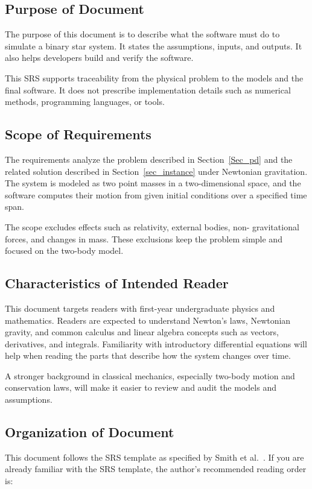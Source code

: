\documentclass[12pt]{article}
\begin{document}
\subsection{Purpose of Document}

The purpose of this document is to describe what the software must do to
simulate a binary star system. It states the assumptions, inputs, and outputs.
It also helps developers build and verify the software.

This SRS supports traceability from the physical problem to the models and the
final software. It does not prescribe implementation details such as numerical
methods, programming languages, or tools.

\subsection{Scope of Requirements} \label{sec_Scope}

The requirements analyze the problem described in Section~\ref{Sec_pd} and the
related solution described in Section~\ref{sec_instance} under Newtonian
gravitation. The system is modeled as two point masses in a two-dimensional
space, and the software computes their motion from given initial conditions over
a specified time span.

The scope excludes effects such as relativity, external bodies, non-
gravitational forces, and changes in mass. These exclusions keep the problem
simple and focused on the two-body model.

\subsection{Characteristics of Intended Reader} \label{sec_IntendedReader}

This document targets readers with first-year undergraduate physics and
mathematics. Readers are expected to understand Newton's laws, Newtonian
gravity, and common calculus and linear algebra concepts such as vectors,
derivatives, and integrals. Familiarity with introductory differential equations
will help when reading the parts that describe how the system changes over time.

A stronger background in classical mechanics, especially two-body motion and
conservation laws, will make it easier to review and audit the models and
assumptions.


\subsection{Organization of Document}
This document follows the SRS template as specified by Smith et al.~\citep{
SmithAndKoothoor2016, SmithAndLai2005, SmithEtAl2007}. If you are already
familiar with the SRS template, the author's recommended reading order is:
\end{document}
